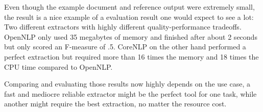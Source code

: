 Even though the example document and reference output were extremely small, the result is a nice example of a evaluation result one would expect to see a lot: Two different extractors with highly different quality-performance tradeoffs. OpenNLP only used 35 megabytes of memory and finished after about 2 seconds but only scored an F-measure of .5. CoreNLP on the other hand performed a perfect extraction but required more than 16 times the memory and 18 times the CPU time compared to OpenNLP.

Comparing and evaluating those results now highly depends on the use case, a fast and mediocre reliable extractor might be the perfect tool for one task, while another might require the best extraction, no matter the resource cost.